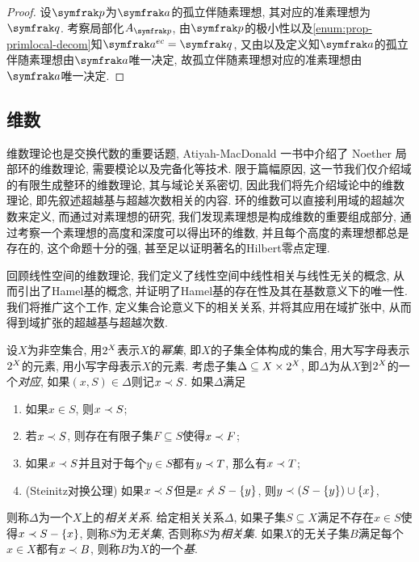 \begin{proof}
  设$\ideal{p}$为$\ideal{a}$的孤立伴随素理想, 其对应的准素理想为$\ideal{q}$. 考察局部化$A_{\ideal{p}}$, 由$\ideal{p}$的极小性以及\ref{enum:prop-primlocal-decom}知$\ideal{a}^{ec}=\ideal{q}$, 又由以及定义知$\ideal{a}$的孤立伴随素理想由$\ideal{a}$唯一决定, 故孤立伴随素理想对应的准素理想由$\ideal{a}$唯一决定.
\end{proof}

\subsection{维数}\label{sec:algebra-dimension}

维数理论也是交换代数的重要话题, Atiyah-MacDonald 一书中介绍了 Noether 局部环的维数理论, 需要模论以及完备化等技术. 限于篇幅原因, 这一节我们仅介绍域的有限生成整环的维数理论, 其与域论关系密切, 因此我们将先介绍域论中的维数理论, 即先叙述超越基与超越次数相关的内容. 环的维数可以直接利用域的超越次数来定义, 而通过对素理想的研究, 我们发现素理想是构成维数的重要组成部分, 通过考察一个素理想的高度和深度可以得出环的维数, 并且每个高度的素理想都总是存在的, 这个命题十分的强, 甚至足以证明著名的Hilbert零点定理.


回顾线性空间的维数理论, 我们定义了线性空间中线性相关与线性无关的概念, 从而引出了Hamel基的概念, 并证明了Hamel基的存在性\footnotemark 及其在基数意义下的唯一性. 我们将推广这个工作, 定义集合论意义下的相关关系, 并将其应用在域扩张中, 从而得到域扩张的超越基与超越次数.

\begin{definition}
  设$X$为非空集合, 用$2^{X}$表示$X$的\emph{幂集}, 即$X$的子集全体构成的集合, 用大写字母表示$2^{X}$的元素, 用小写字母表示$X$的元素. 考虑子集$\Delta\subseteq X\times 2^{X}$, 即$\Delta$为从$X$到$2^{X}$的一个\emph{对应}, 如果$(x, S)\in \Delta$则记$x\prec S$. 如果$\Delta$满足
  \begin{enumerate}
    \item\label{enum:dependaxiom1} 如果$x\in S$, 则$x\prec S$;
    \item\label{enum:dependaxiom2} 若$x\prec S$, 则存在有限子集$F\subseteq S$使得$x\prec F$;
    \item\label{enum:dependaxiom3} 如果$x\prec S$并且对于每个$y\in S$都有$y\prec T$, 那么有$x\prec T$;
    \item\label{enum:dependaxiom4} (Steinitz对换公理) 如果$x\prec S$但是$x\nprec S-\{y\}$, 则$y\prec (S-\{y\})\cup\{x\}$,
  \end{enumerate}
  则称$\Delta$为一个$X$上的\emph{相关关系}. 给定相关关系$\Delta$, 如果子集$S\subseteq X$满足不存在$x\in S$使得$x\prec S-\{x\}$, 则称$S$为\emph{无关集}, 否则称$S$为\emph{相关集}. 如果$X$的无关子集$B$满足每个$x\in X$都有$x\prec B$, 则称$B$为$X$的一个\emph{基}.
\end{definition}

